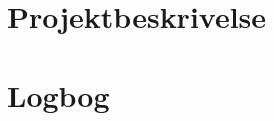 \documentclass[12pt, a4paper]{article}
\begin{document}
    
    \newpage
    
    \newpage
    \tableofcontents
    \newpage
     \newpage
     \newpage
     \newpage
    \newpage
    \printbibliography[heading=bibintoc,title={Litteraturliste}]
    \begin{appendices} \newpage
        \section{Projektbeskrivelse} \newpage
        \renewcommand*{\thepage}{A\arabic{page}}
        
        \renewcommand*{\thepage}{\arabic{page}}
        \section{Logbog} \newpage
        \renewcommand*{\thepage}{B\arabic{page}}
        
        \renewcommand*{\thepage}{\arabic{page}}
    \end{appendices}
\end{document}
